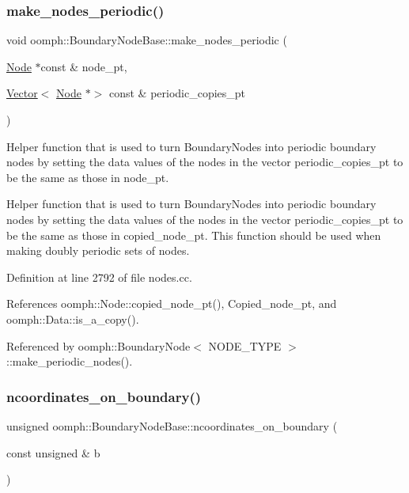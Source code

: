 \subsubsection{\texorpdfstring{make\+\_\+nodes\+\_\+periodic()}{make\_nodes\_periodic()}}
{\footnotesize\ttfamily void oomph\+::\+Boundary\+Node\+Base\+::make\+\_\+nodes\+\_\+periodic (\begin{DoxyParamCaption}\item[{\hyperlink{classoomph_1_1Node}{Node} $\ast$const \&}]{node\+\_\+pt,  }\item[{\hyperlink{classoomph_1_1Vector}{Vector}$<$ \hyperlink{classoomph_1_1Node}{Node} $\ast$$>$ const \&}]{periodic\+\_\+copies\+\_\+pt }\end{DoxyParamCaption})\hspace{0.3cm}{\ttfamily [protected]}}



Helper function that is used to turn Boundary\+Nodes into periodic boundary nodes by setting the data values of the nodes in the vector periodic\+\_\+copies\+\_\+pt to be the same as those in node\+\_\+pt. 

Helper function that is used to turn Boundary\+Nodes into periodic boundary nodes by setting the data values of the nodes in the vector periodic\+\_\+copies\+\_\+pt to be the same as those in copied\+\_\+node\+\_\+pt. This function should be used when making doubly periodic sets of nodes. 

Definition at line 2792 of file nodes.\+cc.



References oomph\+::\+Node\+::copied\+\_\+node\+\_\+pt(), Copied\+\_\+node\+\_\+pt, and oomph\+::\+Data\+::is\+\_\+a\+\_\+copy().



Referenced by oomph\+::\+Boundary\+Node$<$ N\+O\+D\+E\+\_\+\+T\+Y\+P\+E $>$\+::make\+\_\+periodic\+\_\+nodes().

\mbox{\label{classoomph_1_1BoundaryNodeBase_a0a623123c46cafc3e81ede1a981c8663}} 
\subsubsection{\texorpdfstring{ncoordinates\+\_\+on\+\_\+boundary()}{ncoordinates\_on\_boundary()}}
{\footnotesize\ttfamily unsigned oomph\+::\+Boundary\+Node\+Base\+::ncoordinates\+\_\+on\+\_\+boundary (\begin{DoxyParamCaption}\item[{const unsigned \&}]{b }\end{DoxyParamCaption})}



